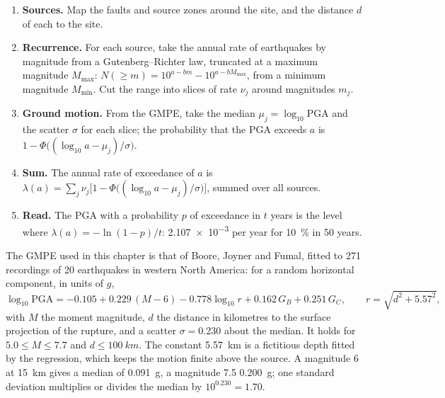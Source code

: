 \begin{method}\label{met:b2:geological-hazards:psha}
\begin{enumerate}
  \item \textbf{Sources.} Map the faults and source zones around the site, and the distance $d$ of
        each to the site.
  \item \textbf{Recurrence.} For each source, take the annual rate of earthquakes by magnitude
        from a Gutenberg--Richter law, truncated at a maximum magnitude $M_{\max}$:
        $N(\geq m) = 10^{a - bm} - 10^{a - bM_{\max}}$, from a minimum magnitude $M_{\min}$.
        Cut the range into slices of rate $\nu_j$ around magnitudes $m_j$.
  \item \textbf{Ground motion.} From the GMPE, take the median $\mu_j = \log_{10}\mathrm{PGA}$ and
        the scatter $\sigma$ for each slice; the probability that the PGA exceeds $a$ is
        $1 - \Phi\bigl((\log_{10} a - \mu_j)/\sigma\bigr)$.
  \item \textbf{Sum.} The annual rate of exceedance of $a$ is $\lambda(a) = \sum_j \nu_j
        \bigl[1 - \Phi\bigl((\log_{10} a - \mu_j)/\sigma\bigr)\bigr]$, summed over all sources.
  \item \textbf{Read.} The PGA with a probability $p$ of exceedance in $t$ years is the level where
        $\lambda(a) = -\ln(1 - p)/t$: \num{2.107e-3} per year for \qty{10}{\percent} in 50 years.
\end{enumerate}
\end{method}

The GMPE used in this chapter is that of Boore, Joyner and Fumal, fitted to 271 recordings of 20
earthquakes in western North America: for a random horizontal component, in units of $g$,
\begin{equation}
\log_{10}\mathrm{PGA} = -0.105 + 0.229\,(M - 6) - 0.778\log_{10} r + 0.162\,G_B + 0.251\,G_C,
\qquad r = \sqrt{d^2 + 5.57^2},
\label{eq:b2:geological-hazards:gmpe}
\end{equation}
with $M$ the moment magnitude, $d$ the distance in kilometres to the surface projection of the
rupture, and a scatter $\sigma = 0.230$ about the median. It holds for $5.0 \leq M \leq 7.7$ and $d
\leq \qty{100}{km}$. The constant \qty{5.57}{km} is a fictitious depth fitted by the regression,
which keeps the motion finite above the source. A magnitude 6 at \qty{15}{km} gives a median of
\qty{0.091}{g}, a magnitude 7.5 \qty{0.200}{g}; one standard deviation multiplies or divides the
median by $10^{0.230} = 1.70$.


